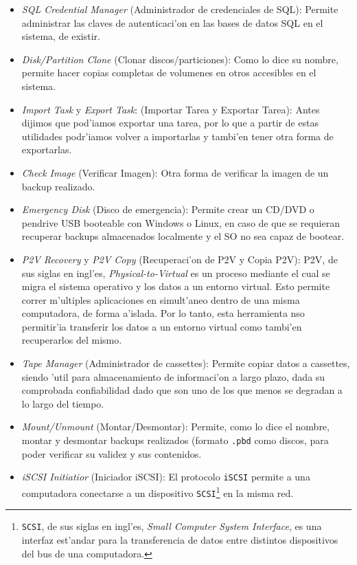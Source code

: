 \documentclass[11pt]{article}
\begin{document}
		\begin{itemize}
			\item \textit{SQL Credential Manager} (Administrador de credenciales de SQL): Permite administrar las claves de autenticaci'on en las bases de datos SQL en el sistema, de existir.
			\item \textit{Disk/Partition Clone} (Clonar discos/particiones): Como lo dice su nombre, permite hacer copias completas de volumenes en otros accesibles en el sistema.
			\item \textit{Import Task} y \textit{Export Task}: (Importar Tarea y Exportar Tarea): Antes dijimos que pod'iamos exportar una tarea, por lo que a partir de estas utilidades podr'iamos volver a importarlas y tambi'en tener otra forma de exportarlas.
			\item \textit{Check Image} (Verificar Imagen): Otra forma de verificar la imagen de un backup realizado.
			\item \textit{Emergency Disk} (Disco de emergencia): Permite crear un CD/DVD o pendrive USB booteable con Windows o Linux, en caso de que se requieran recuperar backups almacenados localmente y el SO no sea capaz de bootear.
			\item \textit{P2V Recovery} y \textit{P2V Copy} (Recuperaci'on de P2V y Copia P2V): P2V, de sus siglas en ingl'es, \textit{Physical-to-Virtual} es un proceso mediante el cual se migra el sistema operativo y los datos a un entorno virtual. Esto permite correr m'ultiples aplicaciones en simult'aneo dentro de una misma computadora, de forma a'islada. Por lo tanto, esta herramienta nso permitir'ia transferir los datos a un entorno virtual como tambi'en recuperarlos del mismo.
			\item \textit{Tape Manager} (Administrador de cassettes): Permite copiar datos a cassettes, siendo 'util para almacenamiento de informaci'on a largo plazo, dada su comprobada confiabilidad dado que son uno de los que menos se degradan a lo largo del tiempo.
			\item \textit{Mount/Unmount} (Montar/Desmontar): Permite, como lo dice el nombre, montar y desmontar backups realizados (formato \texttt{.pbd} como discos, para poder verificar su validez y sus contenidos.
			\item \textit{iSCSI Initiatior} (Iniciador iSCSI): El protocolo \texttt{iSCSI} permite a una computadora conectarse a un dispositivo \texttt{SCSI}\footnote{\texttt{SCSI}, de sus siglas en ingl'es, \textit{Small Computer System Interface}, es una interfaz est'andar para la transferencia de datos entre distintos dispositivos del bus de una computadora.} en la misma red.

\end{itemize}
\end{document}

